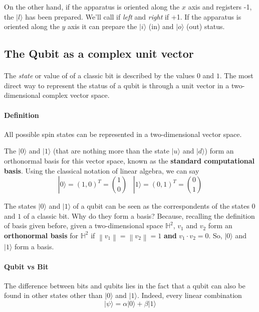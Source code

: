 \documentclass[a4paper,10pt]{article}
\newcommand\norm[1]{\left\lVert#1\right\rVert}
\begin{document}
On the other hand, if the apparatus is oriented along the $x$ axis and registers -1, the $|l\rangle$ has been prepared. We'll call if \textit{left} and \textit{right} if +1. If the apparatus is oriented along the $y$ axis it can prepare the $|i\rangle$ (in) and $|o\rangle$ (out) status.

\subsection{The Qubit as a complex unit vector}

\paragraph{} The \textit{state} or value of of a classic bit is described by the values $0$ and $1$. The most direct way to represent the status of a qubit is through a unit vector in a two-dimensional complex vector space.

\paragraph{Definition} All possible spin states can be represented in a two-dimensional vector space.

The $|0\rangle$ and $|1\rangle$ (that are nothing more than the state $|u\rangle$ and $|d\rangle$) form an orthonormal basis for this vector space, known as the \textbf{standard computational basis}. Using the classical notation of linear algebra, we can say 
$$|0\rangle = (1, 0)^T = \binom{1}{0} \; \; \; |1\rangle = (0, 1)^T =  \binom{0}{1}$$

The states $|0\rangle$ and $|1\rangle$ of a qubit can be seen as the correspondents of the states $0$ and $1$ of a classic bit. Why do they form a basis? Because, recalling the definition of basis given before, given a two-dimensional space ${\mathbb{H}}^2$, $v_1$ and $v_2$ form an \textbf{orthonormal basis} for ${\mathbb{H}}^2$ if $\norm{v_1} = \norm{v_2} = 1$ \textbf{and} $v_1 \cdot v_2 = 0$. So, $|0\rangle$ and $|1\rangle$ form a basis.

\paragraph{Qubit vs Bit}
\label{qubitvsbit}
The difference between bits and qubits lies in the fact that a qubit can also be found in other states other than $|0\rangle$ and $|1\rangle$. Indeed, every linear combination
$$|\psi\rangle = \alpha|0\rangle + \beta|1\rangle$$
\end{document}

